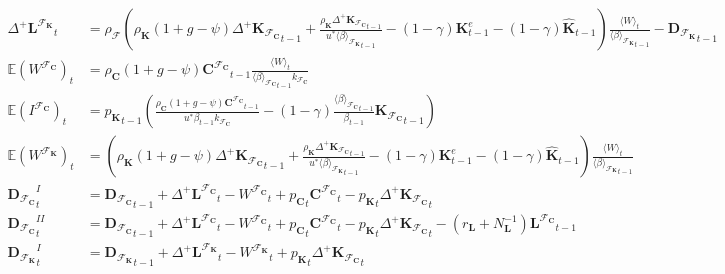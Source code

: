 \documentclass[a4paper, headings=standardclasses]{scrartcl}
\numberwithin{equation}{subsection}
\begin{document}
{\begin{align}
		{\Delta^+{\mathbf{L}^{\mathcal{F}_\mathbf{K}}}}_t & = \rho_\mathcal{F} \left(\rho_\mathbf{K} (1 + g - \psi){\Delta^+\mathbf{K}_{\mathcal{F}_\mathbf{C}}}_{t-1} + \frac{\rho_\mathbf{K} {\Delta^+\mathbf{K}_{\mathcal{F}_\mathbf{C}}}_{t-1}}{u^* {\langle \beta \rangle_{\mathcal{F}_\mathbf{K}}}_{t-1}} - (1-\gamma) \mathbf{K}^e_{t-1} - (1-\gamma)\hat{\mathbf{K}}_{t-1}\right) \frac{\langle W \rangle_t}{{\langle\beta\rangle_{\mathcal{F}_\mathbf{K}}}_{t-1}} - {\mathbf{D}_{\mathcal{F}_\mathbf{K}}}_{t-1} \\
		\mathbb{E}(W^{\mathcal{F}_\mathbf{C}})_t & = \rho_\mathbf{C} (1 + g - \psi) {\mathbf{C}^{\mathcal{F}_\mathbf{C}}}_{t-1} \frac{\langle W \rangle_t}{{\langle\beta\rangle_{\mathcal{F}_\mathbf{C}}}_{t-1} k_{\mathcal{F}_\mathbf{C}}} \\
		\mathbb{E}(I^{\mathcal{F}_\mathbf{C}})_t & = {p_\mathbf{K}}_{t-1} \left(\frac{\rho_\mathbf{C} (1 + g - \psi) {\mathbf{C}^{\mathcal{F}_\mathbf{C}}}_{t-1}}{u^* \beta_{t-1} k_{\mathcal{F}_\mathbf{C}}} - (1 - \gamma) \frac{{\langle\beta\rangle_{\mathcal{F}_\mathbf{C}}}_{t-1}}{\beta_{t-1}} {\mathbf{K}_{\mathcal{F}_\mathbf{C}}}_{t-1}\right)\\
		\mathbb{E}(W^{\mathcal{F}_\mathbf{K}})_t & = (\rho_\mathbf{K} (1 + g - \psi){\Delta^+\mathbf{K}_{\mathcal{F}_\mathbf{C}}}_{t-1} + \frac{\rho_\mathbf{K} {\Delta^+\mathbf{K}_{\mathcal{F}_\mathbf{C}}}_{t-1}}{u^* {\langle \beta \rangle_{\mathcal{F}_\mathbf{K}}}_{t-1}} - (1-\gamma) \mathbf{K}^e_{t-1} - (1-\gamma)\hat{\mathbf{K}}_{t-1}) \frac{\langle W \rangle_t}{{\langle\beta\rangle_{\mathcal{F}_\mathbf{K}}}_{t-1}} \\
		{\mathbf{D}_{\mathcal{F}_\mathbf{C}}}^{I}_t           & = {\mathbf{D}_{\mathcal{F}_\mathbf{C}}}_{t-1} + {\Delta^+{\mathbf{L}^{\mathcal{F}_\mathbf{C}}}}_t - {W^{\mathcal{F}_\mathbf{C}}}_t + {p_{\mathbf{C}}}_t {\mathbf{C}^{\mathcal{F}_\mathbf{C}}}_t - {p_{\mathbf{K}}}_t {\Delta^+{\mathbf{K}_{\mathcal{F}_\mathbf{C}}}}_t \\
		{\mathbf{D}_{\mathcal{F}_\mathbf{C}}}^{II}_t           & = {\mathbf{D}_{\mathcal{F}_\mathbf{C}}}_{t-1} + {\Delta^+{\mathbf{L}^{\mathcal{F}_\mathbf{C}}}}_t - {W^{\mathcal{F}_\mathbf{C}}}_t + {p_{\mathbf{C}}}_t {\mathbf{C}^{\mathcal{F}_\mathbf{C}}}_t - {p_{\mathbf{K}}}_t {\Delta^+{\mathbf{K}_{\mathcal{F}_\mathbf{C}}}}_t - (r_\mathbf{L} + N_\mathbf{L}^{-1}) {\mathbf{L}^{\mathcal{F}_\mathbf{C}}}_{t-1} \\
		{\mathbf{D}_{\mathcal{F}_\mathbf{K}}}^{I}_t           & = {\mathbf{D}_{\mathcal{F}_\mathbf{K}}}_{t-1} + {\Delta^+{\mathbf{L}^{\mathcal{F}_\mathbf{K}}}}_t - {W^{\mathcal{F}_\mathbf{K}}}_t +  {p_{\mathbf{K}}}_t {\Delta^+{\mathbf{K}_{\mathcal{F}_\mathbf{C}}}}_t \\

\end{align}}
\end{document}
